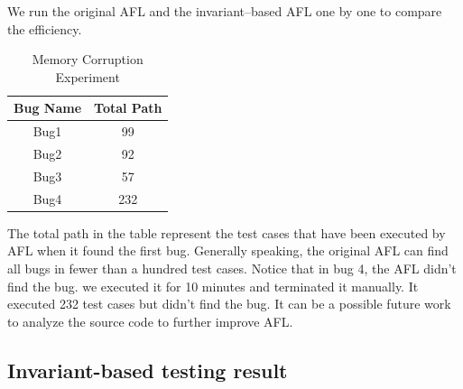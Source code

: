 \documentclass[sigplan,10pt,review = false]{acmart}\settopmatter{printfolios=true,printccs=false,printacmref=false}
\begin{document}
We run the original AFL and the invariant--based AFL one by one to compare the efficiency.

\begin{table}[h!]
\caption{Memory Corruption Experiment}
\begin{center}
\begin{tabular}{ |c|c| } 
\hline
Bug Name & Total Path \\
  \hline
  Bug1  & 99 \\ 
  Bug2 & 92 \\ 
  Bug3 & 57 \\
  Bug4 & 232 \\ 
  \hline
\end{tabular}
\end{center}
\end{table}

The total path in the table represent the test cases that have been executed by AFL when it found the first bug. Generally speaking, the original AFL can find all bugs in fewer than a hundred test cases. Notice that in bug 4, the AFL didn't find the bug. we executed it for 10 minutes and terminated it manually. It executed 232 test cases but didn't find the bug. It can be a possible future work to analyze the source code to further improve AFL.

\subsection{Invariant-based testing result}
\end{document}
